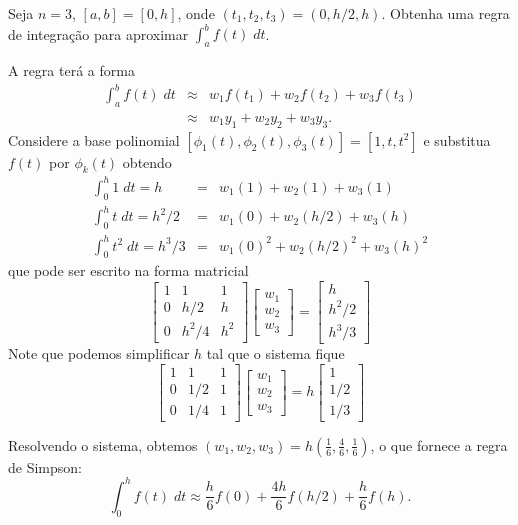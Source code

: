 \begin{ex}
Seja $n=3$, $[a, b]= [0, h]$, onde $(t_1, t_2, t_3) = (0, h/2, h)$. Obtenha uma regra de integração para aproximar $\int _a^b f(t)\;dt$.
\end{ex}
\begin{sol}
A regra terá a forma
\begin{eqnarray}
  \int _a^b f(t)\;dt & \approx& w_1f(t_1)+w_2f(t_2)+w_3f(t_3)\\
                 & \approx& w_1y_1   +w_2y_2   +w_3y_3.
\end{eqnarray}
Considere a base polinomial $[\phi _1(t),\phi _2(t),\phi _3(t)]=[1, t, t^2]$ e substitua $f(t)$ por $\phi_k(t)$ obtendo
\begin{eqnarray}
   \int _0^h 1   \;dt = h     &=&  w_1(1)   +w_2(1)     + w_3(1) \\
   \int _0^h t   \;dt = h^2/2 &=&  w_1(0)   +w_2(h/2)   + w_3(h) \\
   \int _0^h t^2 \;dt = h^3/3 &=&  w_1(0)^2 +w_2(h/2)^2 + w_3(h)^2
\end{eqnarray}
que pode ser escrito na forma matricial
\begin{equation}
\begin{bmatrix}
    1  &  1    &  1 \\
    0  &  h/2    & h  \\
    0  &  h^2/4    & h^2
\end{bmatrix}
\begin{bmatrix}
 w_1 \\ w_2\\ w_3
\end{bmatrix}
=
\begin{bmatrix}
 h  \\ h^2/2 \\ h^3/3
\end{bmatrix}
\end{equation}
Note que podemos simplificar $h$ tal que o sistema fique
\begin{equation}
\begin{bmatrix}
    1  &  1    &  1 \\
    0  &  1/2  & 1  \\
    0  &  1/4  & 1
\end{bmatrix}
\begin{bmatrix}
 w_1 \\ w_2\\ w_3
\end{bmatrix}
=
h
\begin{bmatrix}
 1  \\ 1/2 \\ 1/3
\end{bmatrix}
\end{equation}

Resolvendo o sistema, obtemos $\displaystyle (w_1, w_2, w_3) = h\left(\frac{1}{6}, \frac{4}{6}, \frac{1}{6}\right)$, o que fornece a regra de Simpson:
\begin{equation}
  \int _0^h f(t) \;dt \approx  \frac{h}{6}f(0)+\frac{4h}{6}f(h/2)+\frac{h}{6}f(h).
\end{equation}
\end{sol}


